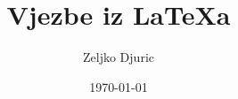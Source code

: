 \documentclass[12pt]{scrartcl}
\begin{document}
    \title{Vjezbe iz \LaTeX a}
    \author{Zeljko Djuric}
    \date{\today}
    \maketitle
\end{document}
